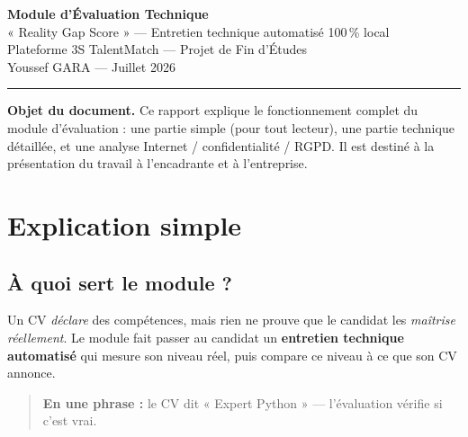 \documentclass[11pt,a4paper]{article}
\begin{document}
\begin{center}
  {\Huge\bfseries\color{bleu3s} Module d'Évaluation Technique}\\[6pt]
  {\Large « Reality Gap Score » --- Entretien technique automatisé 100\,\% local}\\[14pt]
  {\large Plateforme 3S TalentMatch --- Projet de Fin d'Études}\\[4pt]
  {\large Youssef GARA --- Juillet 2026}\\[10pt]
  \rule{0.7\textwidth}{1pt}
\end{center}

\vspace{6pt}
\noindent\textbf{Objet du document.} Ce rapport explique le fonctionnement complet du
module d'évaluation : une partie simple (pour tout lecteur), une partie technique
détaillée, et une analyse Internet / confidentialité / RGPD. Il est destiné à la
présentation du travail à l'encadrante et à l'entreprise.

\tableofcontents
\newpage

\section{Explication simple}

\subsection{À quoi sert le module ?}
Un CV \emph{déclare} des compétences, mais rien ne prouve que le candidat les
\emph{maîtrise réellement}. Le module fait passer au candidat un \textbf{entretien
technique automatisé} qui mesure son niveau réel, puis compare ce niveau à ce que son
CV annonce.

\begin{quote}
\textbf{En une phrase :} le CV dit « Expert Python » --- l'évaluation vérifie si c'est vrai.
\end{quote}
\end{document}
